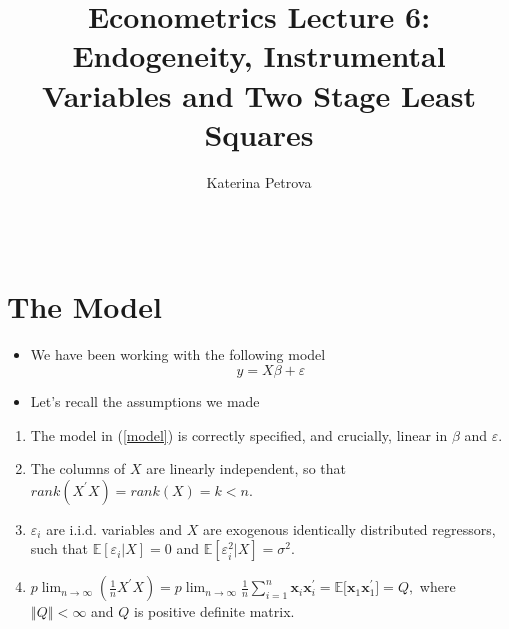 \documentclass[notes=show]{beamer}
\begin{document}
\title{Econometrics Lecture 6: \\
Endogeneity, Instrumental Variables and Two Stage Least Squares}
\author{Katerina Petrova \ \ \ \ \ \ \ \ \ \ \ \ \ \ \ \ \ \ \ \ \ \ \ \ \ \
\ \ \ \ \ \ \ \ \ \ \ \ \ \ \ \ \ \ \ \ \ \ \ \ \ \ \ \ \ \ \ \ \ \ \ \ \ \
\ \ \ \ \ \ \ \ \ \ \ \ \ \ \ \ \ \ \ \ \ \ \ }
\date{}
\maketitle

\section{The Model}

\begin{frame}%


\begin{itemize}
\item We have been working with the following model 
\begin{equation}
y=X\beta +\varepsilon  \label{model}
\end{equation}

\item Let's recall the assumptions we made
\end{itemize}

\begin{enumerate}
\item The model in (\ref{model}) is correctly specified, and crucially,
linear in $\beta $ and $\varepsilon .$

\item The columns of $X$ are linearly independent, so that $rank(X^{\prime
}X)=rank(X)=k<n.$

\item $\varepsilon _{i}$ are i.i.d. variables and $X$ are exogenous
identically distributed regressors, such that $\mathbb{E}[\varepsilon
_{i}|X]=0$ and $\mathbb{E}[\varepsilon _{i}^{2}|X]=\sigma ^{2}.$

\item $p\lim_{n\rightarrow \infty }(\frac{1}{n}X^{\prime
}X)=p\lim_{n\rightarrow \infty }\frac{1}{n}\sum_{i=1}^{n}\mathbf{x}_{i}%
\mathbf{x}_{i}^{\prime }=\mathbb{E[}\mathbf{x}_{1}\mathbf{x}_{1}^{\prime
}]=Q,$ where $\left\Vert Q\right\Vert <\infty $ and $Q$ is positive definite
matrix.
\end{enumerate}

\end{frame}%
\end{document}
